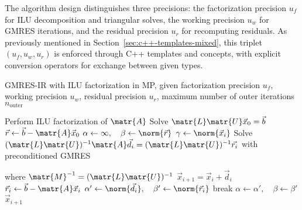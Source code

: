 The algorithm design distinguishes three precisions: the factorization precision
\(u_f\) for ILU decomposition and triangular solves, the working precision
\(u_w\) for GMRES iterations, and the residual precision \(u_r\) for recomputing
residuals. As previously mentioned in Section~\ref{sec:c++-templates-mixed},
this triplet \((u_f, u_w, u_r)\) is enforced through C++ templates and concepts,
with explicit conversion operators for exchange between given types.

\begin{singlespace}
  \begin{algorithm}[h]
    \caption{GMRES-IR with ILU factorization in MP, given factorization
      precision \(u_f\), working precision \(u_w\), residual precision \(u_r\),
      maximum number of outer iterations \(n_{\text{outer}}\)}
    \label{algo:ir}
    \begin{algorithmic}[1]
      \State Perform ILU factorization of \(\matr{A}\) 
      \State Solve \(\matr{L}\matr{U} \vec{x}_0 = \vec{b}\) 
      \State \(\vec{r} \gets \vec{b} - \matr{A}\vec{x}_0\) 
      \State \(\alpha \gets \infty, \quad \beta \gets \norm{\vec{r}}\)
        \State \(\gamma \gets \norm{\vec{x}_i}\)
        \State Solve \((\matr{L}\matr{U})^{-1}\matr{A}\vec{d}_i =
        (\matr{L}\matr{U})^{-1}\vec{r_i}\) with preconditioned GMRES \par
        where \(\matr{M}^{-1} = (\matr{L}\matr{U})^{-1}\) 
        \State \(\vec{x}_{i+1} = \vec{x}_i + \vec{d}_i\) 
        \State \(\vec{r}_i \gets \vec{b} - \matr{A}\vec{x}_i\) 
        \State \(\alpha' \gets \norm{\vec{d}_i}, \quad \beta' \gets \norm{\vec{r}_i}\)
          \State break
        \EndIf
        \State \(\alpha \gets \alpha', \quad \beta \gets \beta'\)
      \EndFor
      \State \Return \(\vec{x}_{i+1}\)
    \end{algorithmic}
  \end{algorithm}
\end{singlespace}

